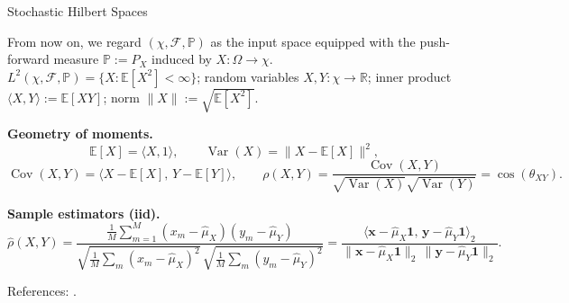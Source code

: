 \documentclass[aspectratio=169]{beamer}
\let\oldcite\cite %
\renewcommand{\cite}[1]{{\tiny\oldcite{#1}}}
\begin{document}
\begin{frame}{Stochastic Hilbert Spaces}

From now on, we regard $(\chi,\mathcal{F},\mathbb{P})$ as the input space
equipped with the push-forward measure $\mathbb{P}:=P_X$ induced by $X:\Omega\!\to\!\chi$. $L^{2}(\chi,\mathcal{F},\mathbb{P})=\{X:\mathbb{E}[X^{2}]<\infty\}$;
random variables $X,Y:\chi\to\mathbb{R}$;
inner product $\langle X,Y\rangle:=\mathbb{E}[XY]$; norm $\|X\|:=\sqrt{\mathbb{E}[X^{2}]}$.

\medskip
\textbf{Geometry of moments.}
\[
\mathbb{E}[X]=\langle X,1\rangle,\qquad
\operatorname{Var}(X)=\|X-\mathbb{E}[X]\|^{2},
\]
\[
\operatorname{Cov}(X,Y)=\langle X-\mathbb{E}[X],\,Y-\mathbb{E}[Y]\rangle,\qquad
\rho(X,Y)=\frac{\operatorname{Cov}(X,Y)}{\sqrt{\operatorname{Var}(X)}\sqrt{\operatorname{Var}(Y)}}
=\cos(\theta_{XY}).
\]

\medskip
\textbf{Sample estimators (iid).}
\[
\widehat{\rho}(X,Y)
=\frac{\tfrac{1}{M}\sum_{m=1}^{M}(x_m-\hat\mu_X)(y_m-\hat\mu_Y)}
{\sqrt{\tfrac{1}{M}\sum_{m}(x_m-\hat\mu_X)^{2}}\,
 \sqrt{\tfrac{1}{M}\sum_{m}(y_m-\hat\mu_Y)^{2}}}
=\frac{\big\langle \mathbf{x}-\hat\mu_X\mathbf{1},\,\mathbf{y}-\hat\mu_Y\mathbf{1}\big\rangle_2}
{\|\mathbf{x}-\hat\mu_X\mathbf{1}\|_2\,\|\mathbf{y}-\hat\mu_Y\mathbf{1}\|_2}.
\]

\medskip
\footnotesize References: \cite{ash2000probability,wasserman2004all}.
\end{frame}
\end{document}
